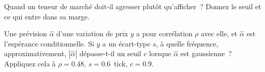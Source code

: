 \begin{interviewq}\label{iq:hf:short-horizon-alpha:5}
Quand un teneur de marché doit-il agresser plutôt qu'afficher~? Donnez le seuil et ce qui entre dans sa marge.
\end{interviewq}

\begin{interviewq}\label{iq:hf:short-horizon-alpha:6}
Une prévision $\hat\alpha$ d'une variation de prix $y$ a pour corrélation $\rho$ avec elle, et $\hat\alpha$ est l'espérance conditionnelle. Si $y$ a un écart-type
$s$, à quelle fréquence, approximativement, $|\hat\alpha|$ dépasse-t-il un seuil $c$ lorsque $\hat\alpha$ est gaussienne~? Appliquez cela à $\rho=0.48$, $s=0.6$~tick, $c=0.9$.
\end{interviewq}
